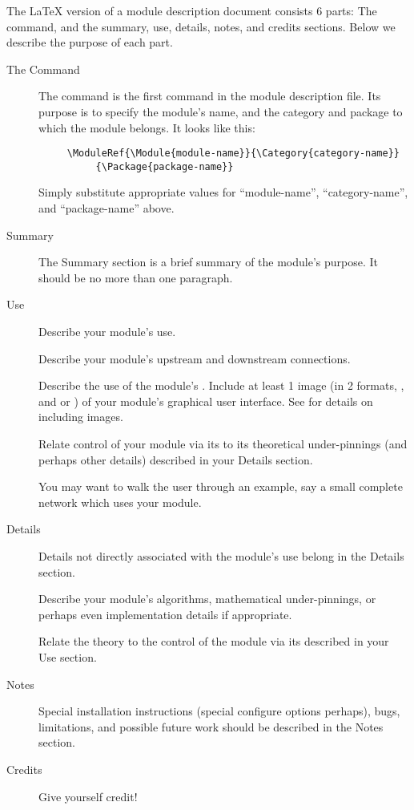 \documentclass[11pt]{article}
\begin{document}
The \LaTeX{} version of a module description document consists 6 parts: The
 command, and the summary, use, details, notes, and
credits sections.  Below we describe the purpose of each part.

\begin{description}
\item[The  Command]\mbox{}
  The  command is the first command in the
  module description file.  Its purpose is to specify the module's
  name, and the category and package to which the module belongs.  It
  looks like this:

\begin{verbatim}
     \ModuleRef{\Module{module-name}}{\Category{category-name}}
          {\Package{package-name}}
\end{verbatim}
  
  Simply substitute appropriate values for ``module-name'',
  ``category-name'', and ``package-name'' above.

\item[Summary]
  \label{sec:summary} \mbox{}
  The Summary section is a brief summary of the module's purpose.  It
  should be no more than one paragraph.

\item[Use] \label{sec:use} \mbox{}
  
  
  Describe your module's use.  
  
  Describe your module's upstream and downstream connections.
  
  Describe the use of the module's \gui{}.  Include at least 1 image
  (in 2 formats, , and  or )
  of your module's graphical user interface.  See  for details on including images.
  
  Relate control of your module via its \gui{} to its theoretical
  under-pinnings (and perhaps other details) described in your
  Details section.
  
  You may want to walk the user through an example, say a small
  complete network which uses your module.

\item[Details] \mbox{}
  \label{sec:details}
  
  Details not directly associated with the module's use belong in
  the Details section.
  
  Describe your module's algorithms, mathematical under-pinnings, or
  perhaps even implementation details if appropriate.
  
  Relate the theory to the control of the module via its \gui{}
  described in your Use section.

\item[Notes]\mbox{}
  \label{sec:notes}
  
  Special installation instructions (special configure options
  perhaps), bugs, limitations, and possible future work should be
  described in the Notes section.

\item[Credits]
  \label{sec:credits}
  
  Give yourself credit!
\end{description}
\end{document}

